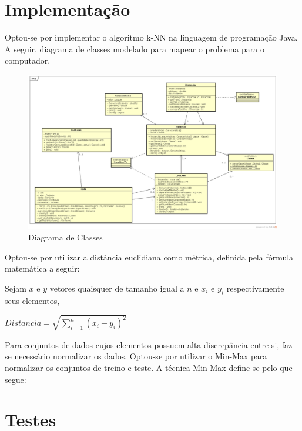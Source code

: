 \documentclass[12pt]{article}
\begin{document}
	\section{Implementação}\label{sec:implementacao}

		Optou-se por implementar o algoritmo k-NN na linguagem de programação Java. A seguir, diagrama de classes modelado para mapear o problema para o computador.

		\begin{landscape}
		\centering
		\begin{figure}[p]
		\includegraphics[width=1.4\textwidth]{classDiagram.png}
		\caption{Diagrama de Classes}
		\label{fig:classDiagram}
		\end{figure}
		\end{landscape}
		\restoregeometry

		Optou-se por utilizar a distância euclidiana como métrica, definida pela fórmula matemática a seguir:

		\noindent Sejam $x$ e $y$ vetores quaisquer de tamanho igual a $n$ e $x_{i}$ e $y_{i}$ respectivamente seus elementos,

		\quad\quad $Distancia = \sqrt{\sum_{i=1}^{n}(x_i - y_i)^2}$

		Para conjuntos de dados cujos elementos possuem alta discrepância entre si, faz-se necessário normalizar os dados. Optou-se por utilizar o Min-Max para normalizar os conjuntos de treino e teste. A técnica Min-Max define-se pelo que segue:


	\section{Testes}\label{sec:testes}
\end{document}
